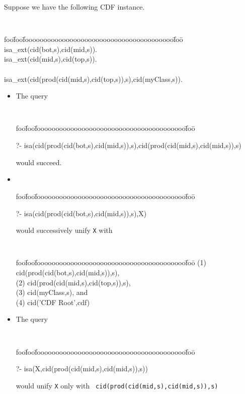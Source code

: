 \begin{example}  \rm Suppose we have the following CDF instance.

{\small {\tt
\begin{tabbing}
foo\=foo\=foooooooooooooooooooooooooooooooooooooooo\=foo\=\kill
%
\> isa\_ext(cid(bot,s),cid(mid,s)). \\
\> isa\_ext(cid(mid,s),cid(top,s)). \\
\\
\> isa\_ext(cid(prod(cid(mid,s),cid(top,s)),s),cid(myClass,s)).
\end{tabbing} } }

\begin{itemize}
%
\item The query 
{\small {\tt
\begin{tabbing}
foo\=foo\=foooooooooooooooooooooooooooooooooooooooo\=foo\=\kill

\> ?- isa(cid(prod(cid(bot,s),cid(mid,s)),s),cid(prod(cid(mid,s),cid(mid,s)),s)
\end{tabbing} } }

would succeed.

\item 
{\small {\tt
\begin{tabbing}
foo\=foo\=foooooooooooooooooooooooooooooooooooooooo\=foo\=\kill

\> ?- isa(cid(prod(cid(bot,s),cid(mid,s)),s),X)
\end{tabbing} } }
would successively unify {\tt X} with 
{\small {\tt
\begin{tabbing}
foo\=foo\=foooooooooooooooooooooooooooooooooooooooo\=foo\=\kill
\> (1) cid(prod(cid(bot,s),cid(mid,s)),s), \\
\> (2) cid(prod(cid(mid,s),cid(top,s)),s), \\
\> (3) cid(myClass,s), {\rm and} \\
\> (4) cid('CDF Root',cdf)
\end{tabbing} } }

\item The query
{\small {\tt
\begin{tabbing}
foo\=foo\=foooooooooooooooooooooooooooooooooooooooo\=foo\=\kill

\> ?- isa(X,cid(prod(cid(mid,s),cid(mid,s)),s))
\end{tabbing} } }
would unify {\tt X} only with {\tt
cid(prod(cid(mid,s),cid(mid,s)),s)}

\end{itemize}
\end{example}

